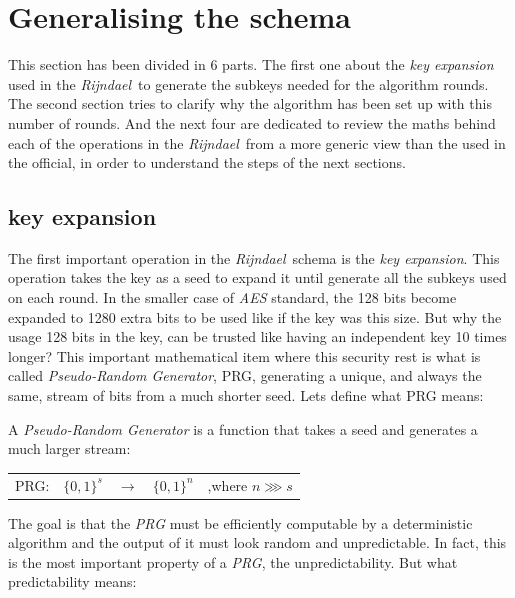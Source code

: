 \documentclass[10pt,a4paper,twoside]{llncs}
\newcommand{\rijndael}{\emph{Rijndael}}
\begin{document}
\section{Generalising the schema}\label{sec:generalising}

This section has been divided in 6 parts. The first one about the \emph{key expansion} used in the \rijndael\, to generate the subkeys needed for the algorithm rounds. The second section tries to clarify why the algorithm has been set up with this number of rounds. And the next four are dedicated to review the maths behind each of the operations in the \rijndael\, from a more generic view than the used in the official, in order to understand the steps of the next sections.

\subsection{key expansion}\label{sec:keyExpansion}
The first important operation in the \rijndael\, schema is the \emph{key expansion}. This operation takes the key as a seed to expand it until generate all the subkeys used on each round. In the smaller case of \emph{AES} standard, the 128 bits become expanded to 1280 extra bits to be used like if the key was this size. But why the usage 128 bits in the key, can be trusted like having an independent key 10 times longer? This important mathematical item where this security rest is what is called \emph{Pseudo-Random Generator}, PRG, generating a unique, and always the same, stream of bits from a much shorter seed. Lets define what PRG means:

\begin{definition}\label{def:PRG}
 A \emph{Pseudo-Random Generator} is a function that takes a seed and generates a much larger stream:
 \begin{center}
  \begin{tabular}{llllr}
   PRG: & $\{0,1\}^{s}$ & $\rightarrow$ & $\{0,1\}^n$ & ,where $n \ggg s$\\
  \end{tabular}
 \end{center}
 
\end{definition}
The goal is that the \emph{PRG} must be efficiently computable by a deterministic algorithm and the output of it must look random and unpredictable. In fact, this is the most important property of a \emph{PRG}, the unpredictability. But what predictability means:
\end{document}
